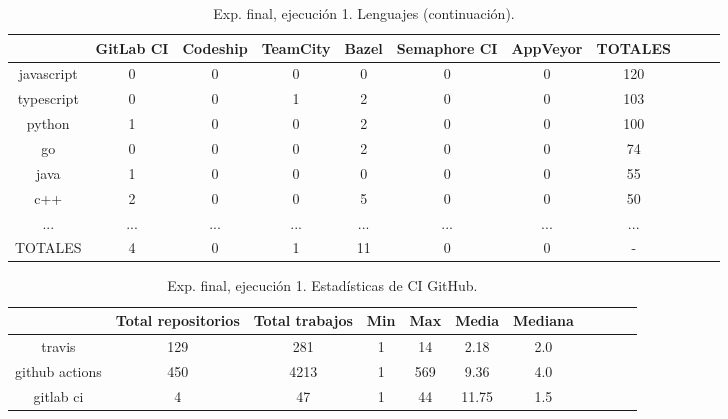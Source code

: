 \begin{table}[h]
  \centering
  \caption{Exp. final, ejecución 1. Lenguajes (continuación).}
  \label{tab:tabla_f1_2b}

\begin{footnotesize}
\renewcommand{\arraystretch}{1.5} %
\begin{tabular}{ccccccccccc}
  \hline
  {} &  GitLab CI &  Codeship &  TeamCity &  Bazel &  Semaphore CI &  AppVeyor &  TOTALES \\
  \hline
  javascript       &        0 &         0 &         0 &      0 &             0 &         0 &    120 \\
  typescript       &        0 &         0 &         1 &      2 &             0 &         0 &    103 \\
  python           &        1 &         0 &         0 &      2 &             0 &         0 &    100 \\
  go               &        0 &         0 &         0 &      2 &             0 &         0 &     74 \\
  java             &        1 &         0 &         0 &      0 &             0 &         0 &     55 \\
  c++              &        2 &         0 &         0 &      5 &             0 &         0 &     50 \\
  ...              &      ... &       ... &       ... &    ... &           ... &       ... &    ... \\
  TOTALES          &        4 &         0 &         1 &     11 &             0 &         0 &      - \\
 \end{tabular}
\end{footnotesize}

\end{table}

\begin{table}[h]
  \centering
  \caption{Exp. final, ejecución 1. Estadísticas de CI GitHub.}
  \label{tab:tabla_f1_3}

\begin{footnotesize}
\renewcommand{\arraystretch}{1.5} %
\begin{tabular}{ccccccccccc}
  \hline
  {} &  Total repositorios &  Total trabajos &  Min &  Max &  Media &  Mediana \\
  \hline
  travis         &        129 &         281 &    1 &   14 &   2.18 &      2.0 \\
  github actions &        450 &        4213 &    1 &  569 &   9.36 &      4.0 \\
  gitlab ci      &          4 &          47 &    1 &   44 &  11.75 &      1.5 \\
 \end{tabular}
\end{footnotesize}

\end{table}

